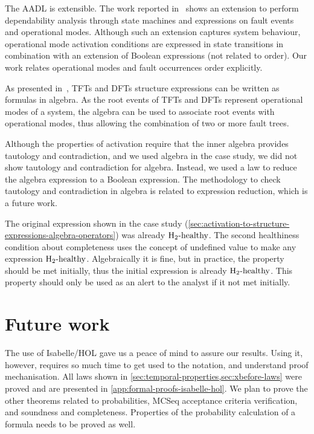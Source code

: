 
The \ac{AADL} is extensible. 
The work reported in~\cite{SAEAS55061A} shows an extension to perform dependability analysis through state machines and expressions on fault events and operational modes.
Although such an extension captures system behaviour, operational mode activation conditions are expressed in state transitions in combination with an extension of Boolean expressions (not related to order).
Our work relates operational modes and fault occurrences order explicitly.

As presented in~\cite{DM2016}, \acp{TFT} and \acp{DFT} structure expressions can be written as formulas in \ac{algebra}.
As the root events of \acp{TFT} and \acp{DFT} represent operational modes of a system, the \ac{algebra} can be used to associate root events with operational modes, thus allowing the combination of two or more fault trees.

Although the properties of \ac{activation} require that the inner algebra provides tautology and contradiction, and we used \ac{algebra} in the case study, we did not show tautology and contradiction for \ac{algebra}. 
Instead, we used a law to reduce the \ac{algebra} expression to a Boolean expression.
The methodology to check tautology and contradiction in \ac{algebra} is related to expression reduction, which is a future work.

The original expression shown in the case study (\cref{sec:activation-to-structure-expressions-algebra-operators}) was already $\healthy[2]$.
The second healthiness condition about completeness uses the concept of undefined value to make any expression $\healthy[2]$.
Algebraically it is fine, but in practice, the property should be met initially, thus the initial expression is already $\healthy[2]$.
This property should only be used as an alert to the analyst if it not met initially.

\section{Future work}

The use of Isabelle/HOL gave us a peace of mind to assure our results.
Using it, however, requires so much time to get used to the notation, and understand proof mechanisation.
All laws shown in \cref{sec:temporal-properties,sec:xbefore-laws} were proved and are presented in \cref{app:formal-proofs-isabelle-hol}.
We plan to prove the other theorems related to probabilities, \ac{MCSeq} acceptance criteria verification, and soundness and completeness.
Properties of the probability calculation of a formula needs to be proved as well.

